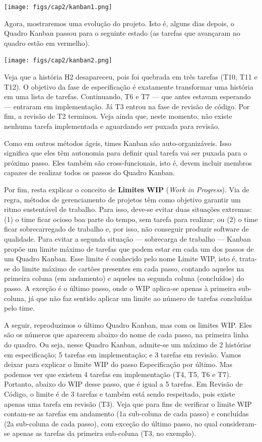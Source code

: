 \documentclass[
  11pt,
  twoside]{book}
\begin{document}
\texttt{[image: figs/cap2/kanban1.png]}

Agora, mostraremos uma evolução do projeto. Isto é, alguns dias depois,
o Quadro Kanban passou para o seguinte estado (as tarefas que avançaram
no quadro estão em vermelho).

\texttt{[image: figs/cap2/kanban2.png]}

Veja que a história H2 desapareceu, pois foi quebrada em três tarefas
(T10, T11 e T12). O objetivo da fase de especificação é exatamente
transformar uma história em uma lista de tarefas. Continuando, T6 e T7
--- que antes estavam esperando --- entraram em implementação. Já T3
entrou na fase de revisão de código. Por fim, a revisão de T2 terminou.
Veja ainda que, neste momento, não existe nenhuma tarefa implementada e
aguardando ser puxada para revisão.

Como em outros métodos ágeis, times Kanban são auto-organizáveis. Isso
significa que eles têm autonomia para definir qual tarefa vai ser puxada
para o próximo passo. Eles também são cross-funcionais, isto é, devem
incluir membros capazes de realizar todos os passos do Quadro Kanban.

 
  Por
fim, resta explicar o conceito de \textbf{Limites WIP} (\emph{Work in
Progress}). Via de regra, métodos de gerenciamento de projetos têm como
objetivo garantir um ritmo sustentável de trabalho. Para isso, deve-se
evitar duas situações extremas: (1) o time ficar ocioso boa parte do
tempo, sem tarefa para realizar; ou (2) o time ficar sobrecarregado de
trabalho e, por isso, não conseguir produzir software de qualidade. Para
evitar a segunda situação --- sobrecarga de trabalho --- Kanban propõe
um limite máximo de tarefas que podem estar em cada um dos passos de um
Quadro Kanban. Esse limite é conhecido pelo nome Limite WIP, isto é,
trata-se do limite máximo de cartões presentes em cada passo, contando
aqueles na primeira coluna (em andamento) e aqueles na segunda coluna
(concluídos) do passo. A exceção é o último passo, onde o WIP aplica-se
apenas à primeira sub-coluna, já que não faz sentido aplicar um limite
ao número de tarefas concluídas pelo time.

A seguir, reproduzimos o último Quadro Kanban, mas com os limites WIP.
Eles são os números que aparecem abaixo do nome de cada passo, na
primeira linha do quadro. Ou seja, nesse Quadro Kanban, admite-se um
máximo de 2 histórias em especificação; 5 tarefas em implementação; e 3
tarefas em revisão. Vamos deixar para explicar o limite WIP do passo
Especificação por último. Mas podemos ver que existem 4 tarefas em
implementação (T4, T5, T6 e T7). Portanto, abaixo do WIP desse passo,
que é igual a 5 tarefas. Em Revisão de Código, o limite é de 3 tarefas e
também está sendo respeitado, pois existe apenas uma tarefa em revisão
(T3). Veja que para fins de verificar o limite WIP contam-se as tarefas
em andamento (1a sub-coluna de cada passo) e concluídas (2a sub-coluna
de cada passo), com exceção do último passo, no qual consideram-se
apenas as tarefas da primeira sub-coluna (T3, no exemplo).
\end{document}
